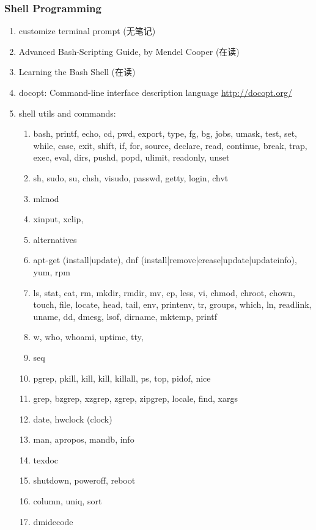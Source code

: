 \documentclass{article}
\begin{document}
\subsubsection{Shell Programming}
\begin{enumerate}
    \item customize terminal prompt (无笔记)
    \item Advanced Bash-Scripting Guide, by Mendel Cooper (在读)
    \item Learning the Bash Shell (在读)
    \item docopt: Command-line interface description language \url{http://docopt.org/}
    \item shell utils and commands:
        \begin{enumerate}
            \item bash, printf, echo, cd, pwd, export, type, fg, bg, jobs, umask, test, set, while, case, exit, shift, if, for, source, declare, read, continue, break, trap, exec, eval, dirs, pushd, popd, ulimit, readonly, unset
            \item sh, sudo, su, chsh, visudo, passwd, getty, login, chvt
            \item mknod
            \item xinput, xclip,
            \item alternatives
            \item apt-get (install|update), dnf (install|remove|erease|update|updateinfo), yum, rpm
            \item ls, stat, cat, rm, mkdir, rmdir, mv, cp, less, vi, chmod, chroot, chown, touch, file, locate, head, tail, env, printenv, tr, groups, which, ln, readlink, uname, dd, dmesg, lsof, dirname, mktemp, printf
            \item w, who, whoami, uptime, tty,
            \item seq
            \item pgrep, pkill, kill, kill, killall, ps, top, pidof, nice
            \item grep, bzgrep, xzgrep, zgrep, zipgrep, locale, find, xargs
            \item date, hwclock (clock)
            \item man, apropos, mandb, info
            \item texdoc
            \item shutdown, poweroff, reboot
            \item column, uniq, sort
            \item dmidecode

\end{enumerate}
\end{enumerate}
\end{document}
